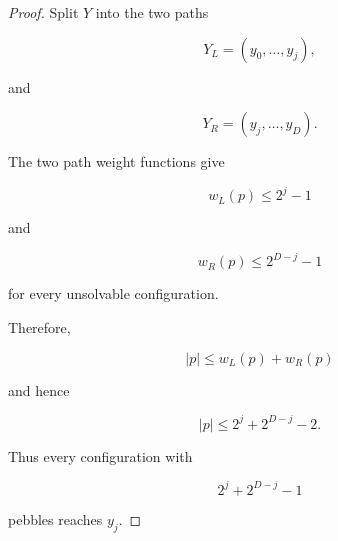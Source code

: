 \begin{proof}

Split $Y$ into the two paths

\[
Y_L=(y_0,\ldots,y_j),
\]

and

\[
Y_R=(y_j,\ldots,y_D).
\]

The two path weight functions give

\[
w_L(p)\le2^j-1
\]

and

\[
w_R(p)\le2^{D-j}-1
\]

for every unsolvable configuration.

Therefore,

\[
|p|
\le
w_L(p)+w_R(p)
\]

and hence

\[
|p|
\le
2^j+2^{D-j}-2 .
\]

Thus every configuration with

\[
2^j+2^{D-j}-1
\]

pebbles reaches $y_j$.

\end{proof}